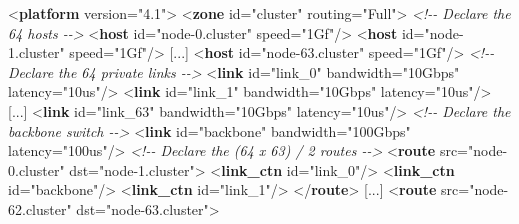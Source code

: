 \documentclass[
]{article}
\newenvironment{Shaded}{}{}
\newcommand{\CommentTok}[1]{\textcolor[rgb]{0.38,0.63,0.69}{\textit{#1}}}
\newcommand{\KeywordTok}[1]{\textcolor[rgb]{0.00,0.44,0.13}{\textbf{#1}}}
\newcommand{\NormalTok}[1]{#1}
\newcommand{\OtherTok}[1]{\textcolor[rgb]{0.00,0.44,0.13}{#1}}
\newcommand{\StringTok}[1]{\textcolor[rgb]{0.25,0.44,0.63}{#1}}
\begin{document}
\begin{Shaded}
\begin{Highlighting}[]
\NormalTok{\textless{}}\KeywordTok{platform} \OtherTok{version=}\StringTok{"4.1"}\NormalTok{\textgreater{}}
\NormalTok{    \textless{}}\KeywordTok{zone} \OtherTok{id=}\StringTok{"cluster"} \OtherTok{routing=}\StringTok{"Full"}\NormalTok{\textgreater{}}
    \CommentTok{\textless{}!{-}{-} Declare the 64 hosts {-}{-}\textgreater{}}
\NormalTok{    \textless{}}\KeywordTok{host} \OtherTok{id=}\StringTok{"node{-}0.cluster"} \OtherTok{speed=}\StringTok{"1Gf"}\NormalTok{/\textgreater{}}
\NormalTok{    \textless{}}\KeywordTok{host} \OtherTok{id=}\StringTok{"node{-}1.cluster"} \OtherTok{speed=}\StringTok{"1Gf"}\NormalTok{/\textgreater{}}
\NormalTok{    [...]}
\NormalTok{    \textless{}}\KeywordTok{host} \OtherTok{id=}\StringTok{"node{-}63.cluster"} \OtherTok{speed=}\StringTok{"1Gf"}\NormalTok{/\textgreater{}}
    \CommentTok{\textless{}!{-}{-} Declare the 64 private links {-}{-}\textgreater{}}
\NormalTok{    \textless{}}\KeywordTok{link} \OtherTok{id=}\StringTok{"link\_0"} \OtherTok{bandwidth=}\StringTok{"10Gbps"} \OtherTok{latency=}\StringTok{"10us"}\NormalTok{/\textgreater{}}
\NormalTok{    \textless{}}\KeywordTok{link} \OtherTok{id=}\StringTok{"link\_1"} \OtherTok{bandwidth=}\StringTok{"10Gbps"} \OtherTok{latency=}\StringTok{"10us"}\NormalTok{/\textgreater{}}
\NormalTok{    [...]}
\NormalTok{    \textless{}}\KeywordTok{link} \OtherTok{id=}\StringTok{"link\_63"} \OtherTok{bandwidth=}\StringTok{"10Gbps"} \OtherTok{latency=}\StringTok{"10us"}\NormalTok{/\textgreater{}}
    \CommentTok{\textless{}!{-}{-} Declare the backbone switch {-}{-}\textgreater{}}
\NormalTok{    \textless{}}\KeywordTok{link} \OtherTok{id=}\StringTok{"backbone"} \OtherTok{bandwidth=}\StringTok{"100Gbps"} \OtherTok{latency=}\StringTok{"100us"}\NormalTok{/\textgreater{}}
    \CommentTok{\textless{}!{-}{-} Declare the (64 x 63) / 2 routes {-}{-}\textgreater{}}
\NormalTok{    \textless{}}\KeywordTok{route} \OtherTok{src=}\StringTok{"node{-}0.cluster"} \OtherTok{dst=}\StringTok{"node{-}1.cluster"}\NormalTok{\textgreater{}}
\NormalTok{    \textless{}}\KeywordTok{link\_ctn} \OtherTok{id=}\StringTok{"link\_0"}\NormalTok{/\textgreater{}}
\NormalTok{    \textless{}}\KeywordTok{link\_ctn} \OtherTok{id=}\StringTok{"backbone"}\NormalTok{/\textgreater{}}
\NormalTok{    \textless{}}\KeywordTok{link\_ctn} \OtherTok{id=}\StringTok{"link\_1"}\NormalTok{/\textgreater{}}
\NormalTok{    \textless{}/}\KeywordTok{route}\NormalTok{\textgreater{}}
\NormalTok{    [...]}
\NormalTok{    \textless{}}\KeywordTok{route} \OtherTok{src=}\StringTok{"node{-}62.cluster"} \OtherTok{dst=}\StringTok{"node{-}63.cluster"}\NormalTok{\textgreater{}}

\end{Highlighting}
\end{Shaded}
\end{document}
